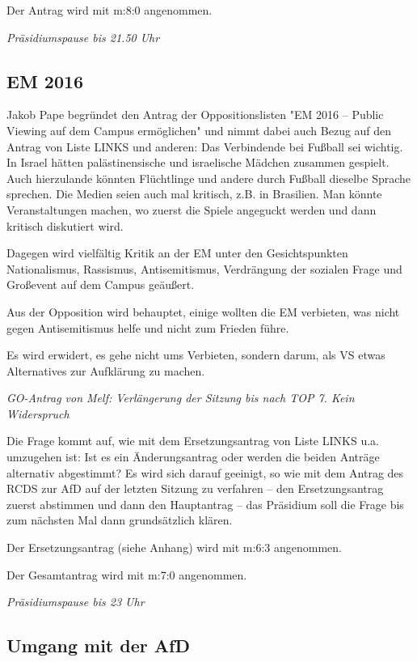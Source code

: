 \documentclass[ngerman,headheight=70pt]{scrartcl}
\begin{document}
    Der Antrag wird mit m:8:0 angenommen.

    \textit{Präsidiumspause bis 21.50 Uhr}

    \subsection{EM 2016}

    Jakob Pape begründet den Antrag der Oppositionslisten "EM 2016 – Public
    Viewing auf dem Campus ermöglichen" und nimmt dabei auch Bezug auf den Antrag
    von Liste LINKS und anderen: Das Verbindende bei Fußball sei wichtig. In
    Israel hätten palästinensische und israelische Mädchen zusammen gespielt.
    Auch hierzulande könnten Flüchtlinge und andere durch Fußball dieselbe
    Sprache sprechen. Die Medien seien auch mal kritisch, z.B. in Brasilien. Man
    könnte Veranstaltungen machen, wo zuerst die Spiele angeguckt werden und dann
    kritisch diskutiert wird.

    Dagegen wird vielfältig Kritik an der EM unter den Gesichtspunkten
    Nationalismus, Rassismus, Antisemitismus, Verdrängung der sozialen Frage und
    Großevent auf dem Campus geäußert.

    Aus der Opposition wird behauptet, einige wollten die EM verbieten, was nicht
    gegen Antisemitismus helfe und nicht zum Frieden führe.

    Es wird erwidert, es gehe nicht ums Verbieten, sondern darum, als VS etwas
    Alternatives zur Aufklärung zu machen.

    \textit{GO-Antrag von Melf: Verlängerung der Sitzung bis nach TOP 7.
    Kein Widerspruch}

    Die Frage kommt auf, wie mit dem Ersetzungsantrag von Liste LINKS
    u.a. umzugehen ist: Ist es ein Änderungsantrag oder werden die beiden Anträge
    alternativ abgestimmt? Es wird sich darauf geeinigt, so wie mit dem Antrag
    des RCDS zur AfD auf der letzten Sitzung zu verfahren -- den Ersetzungsantrag
    zuerst abstimmen und dann den Hauptantrag -- das Präsidium soll die Frage bis
    zum nächsten Mal dann grundsätzlich klären.

    Der Ersetzungsantrag (siehe Anhang) wird mit m:6:3 angenommen.

    Der Gesamtantrag wird mit m:7:0 angenommen.

    \textit{Präsidiumspause bis 23 Uhr}

    \subsection{Umgang mit der AfD}
\end{document}
